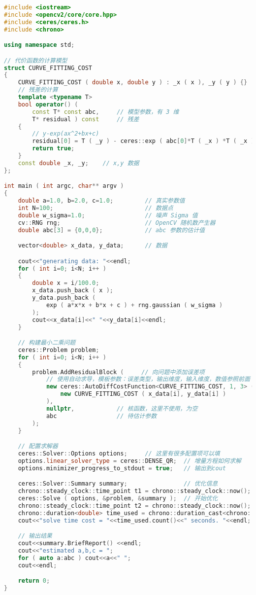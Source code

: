 \begin{lstlisting}[language=c++,caption=slambook/ch6/ceres_curve_fitting/main.cpp]
#include <iostream>
#include <opencv2/core/core.hpp>
#include <ceres/ceres.h>
#include <chrono>

using namespace std;

// 代价函数的计算模型
struct CURVE_FITTING_COST
{
	CURVE_FITTING_COST ( double x, double y ) : _x ( x ), _y ( y ) {}
	// 残差的计算
	template <typename T>
	bool operator() (
		const T* const abc,     // 模型参数，有 3 维
		T* residual ) const     // 残差	
	{
		// y-exp(ax^2+bx+c)
		residual[0] = T ( _y ) - ceres::exp ( abc[0]*T ( _x ) *T ( _x ) + abc[1]*T ( _x ) + abc[2] ); 
		return true;
	}
	const double _x, _y;    // x,y 数据
};

int main ( int argc, char** argv )
{
	double a=1.0, b=2.0, c=1.0;         // 真实参数值
	int N=100;                          // 数据点
	double w_sigma=1.0;                 // 噪声 Sigma 值
	cv::RNG rng;                        // OpenCV 随机数产生器
	double abc[3] = {0,0,0};            // abc 参数的估计值

	vector<double> x_data, y_data;      // 数据

	cout<<"generating data: "<<endl;
	for ( int i=0; i<N; i++ )
	{
		double x = i/100.0;
		x_data.push_back ( x );
		y_data.push_back (
			exp ( a*x*x + b*x + c ) + rng.gaussian ( w_sigma )
		);
		cout<<x_data[i]<<" "<<y_data[i]<<endl;
	}

	// 构建最小二乘问题
	ceres::Problem problem;
	for ( int i=0; i<N; i++ )
	{
		problem.AddResidualBlock (     // 向问题中添加误差项
			// 使用自动求导，模板参数：误差类型，输出维度，输入维度，数值参照前面 struct 中写法
			new ceres::AutoDiffCostFunction<CURVE_FITTING_COST, 1, 3> ( 
				new CURVE_FITTING_COST ( x_data[i], y_data[i] )
			),
			nullptr,            // 核函数，这里不使用，为空
			abc                 // 待估计参数
		);
	}

	// 配置求解器
	ceres::Solver::Options options;     // 这里有很多配置项可以填
	options.linear_solver_type = ceres::DENSE_QR;  // 增量方程如何求解
	options.minimizer_progress_to_stdout = true;   // 输出到cout

	ceres::Solver::Summary summary;                // 优化信息
	chrono::steady_clock::time_point t1 = chrono::steady_clock::now();
	ceres::Solve ( options, &problem, &summary );  // 开始优化
	chrono::steady_clock::time_point t2 = chrono::steady_clock::now();
	chrono::duration<double> time_used = chrono::duration_cast<chrono::duration<double>>( t2-t1 );
	cout<<"solve time cost = "<<time_used.count()<<" seconds. "<<endl;

	// 输出结果
	cout<<summary.BriefReport() <<endl;
	cout<<"estimated a,b,c = ";
	for ( auto a:abc ) cout<<a<<" ";
	cout<<endl;

	return 0;
}
\end{lstlisting}

